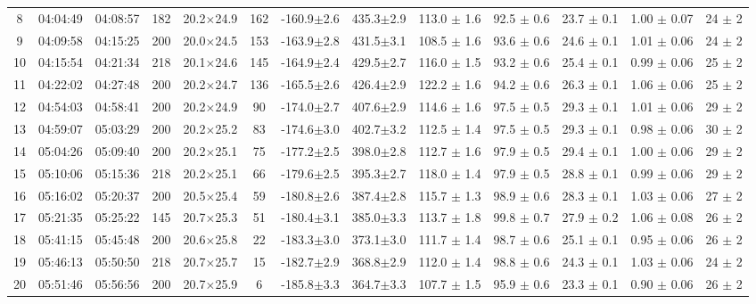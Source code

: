 \documentclass[]{aastex631}
\begin{document}
\begin{table}[h!]
\begin{center}
\begin{tabular}{ccccccccccccc}
8 & 04:04:49 & 04:08:57 & 182 & 20.2$\times$24.9 & 162 & -160.9$\pm$2.6 & 435.3$\pm$2.9 & 113.0 $\pm$ 1.6 & 92.5 $\pm$ 0.6 & 23.7 $\pm$ 0.1 & 1.00 $\pm$ 0.07 & 24 $\pm$ 2 \\ 
9 & 04:09:58 & 04:15:25 & 200 & 20.0$\times$24.5 & 153 & -163.9$\pm$2.8 & 431.5$\pm$3.1 & 108.5 $\pm$ 1.6 & 93.6 $\pm$ 0.6 & 24.6 $\pm$ 0.1 & 1.01 $\pm$ 0.06 & 24 $\pm$ 2 \\ 
10 & 04:15:54 & 04:21:34 & 218 & 20.1$\times$24.6 & 145 & -164.9$\pm$2.4 & 429.5$\pm$2.7 & 116.0 $\pm$ 1.5 & 93.2 $\pm$ 0.6 & 25.4 $\pm$ 0.1 & 0.99 $\pm$ 0.06 & 25 $\pm$ 2 \\ 
11 & 04:22:02 & 04:27:48 & 200 & 20.2$\times$24.7 & 136 & -165.5$\pm$2.6 & 426.4$\pm$2.9 & 122.2 $\pm$ 1.6 & 94.2 $\pm$ 0.6 & 26.3 $\pm$ 0.1 & 1.06 $\pm$ 0.06 & 25 $\pm$ 2 \\ 
12 & 04:54:03 & 04:58:41 & 200 & 20.2$\times$24.9 & 90 & -174.0$\pm$2.7 & 407.6$\pm$2.9 & 114.6 $\pm$ 1.6 & 97.5 $\pm$ 0.5 & 29.3 $\pm$ 0.1 & 1.01 $\pm$ 0.06 & 29 $\pm$ 2 \\ 
13 & 04:59:07 & 05:03:29 & 200 & 20.2$\times$25.2 & 83 & -174.6$\pm$3.0 & 402.7$\pm$3.2 & 112.5 $\pm$ 1.4 & 97.5 $\pm$ 0.5 & 29.3 $\pm$ 0.1 & 0.98 $\pm$ 0.06 & 30 $\pm$ 2 \\ 
14 & 05:04:26 & 05:09:40 & 200 & 20.2$\times$25.1 & 75 & -177.2$\pm$2.5 & 398.0$\pm$2.8 & 112.7 $\pm$ 1.6 & 97.9 $\pm$ 0.5 & 29.4 $\pm$ 0.1 & 1.00 $\pm$ 0.06 & 29 $\pm$ 2 \\ 
15 & 05:10:06 & 05:15:36 & 218 & 20.2$\times$25.1 & 66 & -179.6$\pm$2.5 & 395.3$\pm$2.7 & 118.0 $\pm$ 1.4 & 97.9 $\pm$ 0.5 & 28.8 $\pm$ 0.1 & 0.99 $\pm$ 0.06 & 29 $\pm$ 2 \\ 
16 & 05:16:02 & 05:20:37 & 200 & 20.5$\times$25.4 & 59 & -180.8$\pm$2.6 & 387.4$\pm$2.8 & 115.7 $\pm$ 1.3 & 98.9 $\pm$ 0.6 & 28.3 $\pm$ 0.1 & 1.03 $\pm$ 0.06 & 27 $\pm$ 2 \\ 
17 & 05:21:35 & 05:25:22 & 145 & 20.7$\times$25.3 & 51 & -180.4$\pm$3.1 & 385.0$\pm$3.3 & 113.7 $\pm$ 1.8 & 99.8 $\pm$ 0.7 & 27.9 $\pm$ 0.2 & 1.06 $\pm$ 0.08 & 26 $\pm$ 2 \\ 
18 & 05:41:15 & 05:45:48 & 200 & 20.6$\times$25.8 & 22 & -183.3$\pm$3.0 & 373.1$\pm$3.0 & 111.7 $\pm$ 1.4 & 98.7 $\pm$ 0.6 & 25.1 $\pm$ 0.1 & 0.95 $\pm$ 0.06 & 26 $\pm$ 2 \\ 
19 & 05:46:13 & 05:50:50 & 218 & 20.7$\times$25.7 & 15 & -182.7$\pm$2.9 & 368.8$\pm$2.9 & 112.0 $\pm$ 1.4 & 98.8 $\pm$ 0.6 & 24.3 $\pm$ 0.1 & 1.03 $\pm$ 0.06 & 24 $\pm$ 2 \\ 
20 & 05:51:46 & 05:56:56 & 200 & 20.7$\times$25.9 & 6 & -185.8$\pm$3.3 & 364.7$\pm$3.3 & 107.7 $\pm$ 1.5 & 95.9 $\pm$ 0.6 & 23.3 $\pm$ 0.1 & 0.90 $\pm$ 0.06 & 26 $\pm$ 2 \\ 

\end{tabular}
\end{center}
\end{table}
\end{document}
